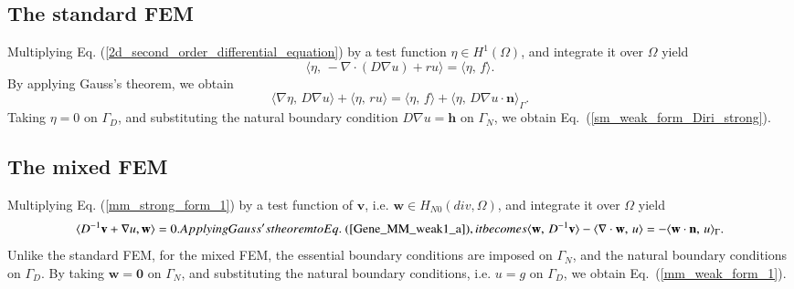\documentclass[review,3p]{elsarticle}
\begin{document}
\subsection{The standard FEM}		\label{derivation_weak_form_SM}

Multiplying Eq. (\ref{2d_second_order_differential_equation}) by a test function $\eta \in H ^1 (\Omega)$, and integrate it over $\Omega$ yield
\begin{equation}
\langle \eta, \, - \nabla \cdot \left( D \nabla u \right) + ru \rangle = \langle \eta, \, f \rangle. \label{1D_general_inte}
\end{equation}
By applying Gauss's theorem, we obtain
\begin{equation}
 \langle {\nabla \eta}, \, D \nabla u \rangle + \langle \eta, \, ru \rangle = \langle \eta, \, f \rangle + \langle \eta, \, D \nabla u \cdot \mathbf{n} \rangle_{ {\Gamma}}.		\label{1D_general_gauss}
\end{equation}
Taking $\eta=0$ on $\Gamma_{D}$, and substituting the natural boundary condition $D \nabla u=\mathbf{h}$ on $\Gamma_N$, we obtain Eq.~({\ref{sm_weak_form_Diri_strong}}).

\subsection{The mixed FEM}		\label{derivation_weak_form_MM}
Multiplying Eq. (\ref{mm_strong_form_1}) by a test function of $\mathbf{v}$, i.e. $\mathbf{w} \in H _{N0}(div, \Omega)$, and integrate it over $\Omega$ yield
\begin{subequations}
\begin{align}
  \langle D^{-1}\mathbf{v} + \nabla u, \mathbf{w} \rangle = 0.	\label{Gene_MM_weak1_a}
\end{align}
Applying Gauss's theorem to Eq.~(\ref{Gene_MM_weak1_a}), it becomes
\begin{align}
 \langle \mathbf{w}, \, D^{-1}\mathbf{v} \rangle - \langle \nabla \cdot \mathbf{w}, \,  u \rangle = -\langle \mathbf{w} \cdot \mathbf{n}, \, u \rangle_{\Gamma}.		\label{Gene_MM_weak1_b}
\end{align}				\label{Gene_MM_weak1}%
\end{subequations}
Unlike the standard FEM, for the mixed FEM, the essential boundary conditions are imposed on $\Gamma _N$, and the natural boundary conditions on $\Gamma _D$.
By taking $\mathbf{w}=\mathbf{0}$ on $\Gamma_{N}$, and substituting the natural boundary conditions, i.e. $u=g$ on $\Gamma_D$, we obtain Eq.~(\ref{mm_weak_form_1}).
\end{document}
